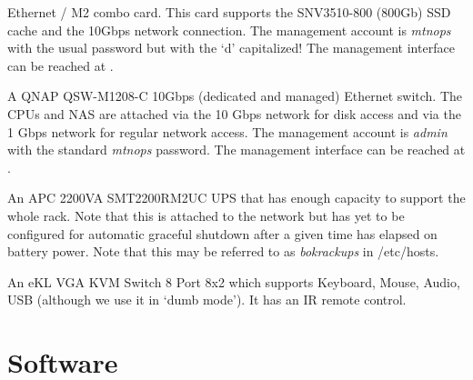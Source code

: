 \documentclass[12pt,twoside]{article}
\begin{document}
\begin{description}
              Ethernet / M2 combo card. This card supports the SNV3510-800 (800Gb) SSD cache and the 10Gbps
              network connection. The management account is \emph{mtnops} with the usual password but with the `d' capitalized!
              The management interface can be reached at .
\item[\sfmagenta{bokqnap}] A QNAP QSW-M1208-C 10Gbps (dedicated and managed) Ethernet switch. The CPUs and NAS are attached
              via the 10 Gbps network for disk access and via the 1 Gbps network for regular network access. The management
              account is \emph{admin} with the standard \emph{mtnops} password. The management interface can be reached at
              .
\item[\sfmagenta{bokups}] An APC 2200VA SMT2200RM2UC UPS that has enough capacity to support the whole rack. Note that this is
              attached to the network but has yet to be configured for automatic graceful shutdown after a given time has
              elapsed on battery power. Note that this may be referred to as \emph{bokrackups} in /etc/hosts.
\item[\sfmagenta{bokkvm}] An eKL VGA KVM Switch 8 Port 8x2 which supports Keyboard, Mouse, Audio, USB (although we use it in
              `dumb mode'). It has an IR remote control.
\end{description}

\section{Software}
\label{Software}
\end{document}

